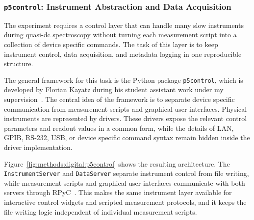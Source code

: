         \subsubsection*{\texttt{p5control}: Instrument Abstraction and Data Acquisition}

            The experiment requires a control layer that can handle many slow instruments during quasi-dc spectroscopy without turning each measurement script into a collection of device specific commands. The task of this layer is to keep instrument control, data acquisition, and metadata logging in one reproducible structure.

            The general framework for this task is the Python package \texttt{p5control}, which is developed by Florian Kayatz during his student assistant work under my supervision~\cite{kayatz_p5control}. The central idea of the framework is to separate device specific communication from measurement scripts and graphical user interfaces. Physical instruments are represented by drivers. These drivers expose the relevant control parameters and readout values in a common form, while the details of LAN, GPIB, RS-232, USB, or device specific command syntax remain hidden inside the driver implementation.

            Figure~\ref{fig:methods:digital:p5control} shows the resulting architecture. The \texttt{InstrumentServer} and \texttt{DataServer} separate instrument control from file writing, while measurement scripts and graphical user interfaces communicate with both servers through RPyC~\cite{rpyc_github}. This makes the same instrument layer available for interactive control widgets and scripted measurement protocols, and it keeps the file writing logic independent of individual measurement scripts.

